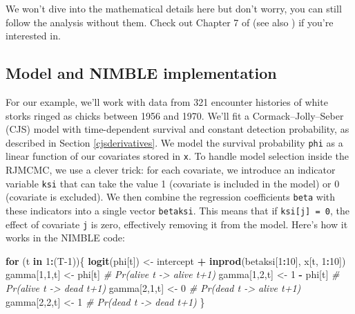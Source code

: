 \documentclass[
  12pt,
]{krantz}
\newenvironment{Shaded}{\begin{snugshade}}{\end{snugshade}}
\newcommand{\CommentTok}[1]{\textcolor[rgb]{0.56,0.35,0.01}{\textit{#1}}}
\newcommand{\ControlFlowTok}[1]{\textcolor[rgb]{0.13,0.29,0.53}{\textbf{#1}}}
\newcommand{\DecValTok}[1]{\textcolor[rgb]{0.00,0.00,0.81}{#1}}
\newcommand{\FunctionTok}[1]{\textcolor[rgb]{0.13,0.29,0.53}{\textbf{#1}}}
\newcommand{\NormalTok}[1]{#1}
\newcommand{\OtherTok}[1]{\textcolor[rgb]{0.56,0.35,0.01}{#1}}
\newcommand{\SpecialCharTok}[1]{\textcolor[rgb]{0.81,0.36,0.00}{\textbf{#1}}}
\begin{document}
We won't dive into the mathematical details here but don't worry, you can still follow the analysis without them. Check out Chapter 7 of \citet{king_bayesian_2009} (see also \citet{gimenez2009winbugs}) if you're interested in.

\subsection{Model and NIMBLE implementation}\label{model-and-nimble-implementation}

For our example, we'll work with data from 321 encounter histories of white storks ringed as chicks between 1956 and 1970. We'll fit a Cormack--Jolly--Seber (CJS) model with time-dependent survival and constant detection probability, as described in Section \ref{cjsderivatives}. We model the survival probability \texttt{phi} as a linear function of our covariates stored in \texttt{x}. To handle model selection inside the RJMCMC, we use a clever trick: for each covariate, we introduce an indicator variable \texttt{ksi} that can take the value 1 (covariate is included in the model) or 0 (covariate is excluded). We then combine the regression coefficients \texttt{beta} with these indicators into a single vector \texttt{betaksi}. This means that if \texttt{ksi{[}j{]}\ =\ 0}, the effect of covariate \texttt{j} is zero, effectively removing it from the model. Here's how it works in the NIMBLE code:

\begin{Shaded}
\begin{Highlighting}[]
\ControlFlowTok{for}\NormalTok{ (t }\ControlFlowTok{in} \DecValTok{1}\SpecialCharTok{:}\NormalTok{(T}\DecValTok{{-}1}\NormalTok{))\{}
  \FunctionTok{logit}\NormalTok{(phi[t]) }\OtherTok{\textless{}{-}}\NormalTok{ intercept }\SpecialCharTok{+} \FunctionTok{inprod}\NormalTok{(betaksi[}\DecValTok{1}\SpecialCharTok{:}\DecValTok{10}\NormalTok{], x[t, }\DecValTok{1}\SpecialCharTok{:}\DecValTok{10}\NormalTok{])}
\NormalTok{  gamma[}\DecValTok{1}\NormalTok{,}\DecValTok{1}\NormalTok{,t] }\OtherTok{\textless{}{-}}\NormalTok{ phi[t]      }\CommentTok{\# Pr(alive t {-}\textgreater{} alive t+1)}
\NormalTok{  gamma[}\DecValTok{1}\NormalTok{,}\DecValTok{2}\NormalTok{,t] }\OtherTok{\textless{}{-}} \DecValTok{1} \SpecialCharTok{{-}}\NormalTok{ phi[t]  }\CommentTok{\# Pr(alive t {-}\textgreater{} dead t+1)}
\NormalTok{  gamma[}\DecValTok{2}\NormalTok{,}\DecValTok{1}\NormalTok{,t] }\OtherTok{\textless{}{-}} \DecValTok{0}           \CommentTok{\# Pr(dead t {-}\textgreater{} alive t+1)}
\NormalTok{  gamma[}\DecValTok{2}\NormalTok{,}\DecValTok{2}\NormalTok{,t] }\OtherTok{\textless{}{-}} \DecValTok{1}           \CommentTok{\# Pr(dead t {-}\textgreater{} dead t+1)}
\NormalTok{\}}
\end{Highlighting}
\end{Shaded}
\end{document}
